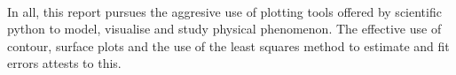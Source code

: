 \documentclass[a4paper, 11pt, margin= 1.25cm]{article}
\begin{document}
\paragraph{} In all, this report pursues the aggresive use of plotting tools offered
by scientific python to model, visualise and study physical phenomenon.
The effective use of contour, surface plots and the use of the least
squares method to estimate and fit errors attests to this.


    
    
    
    
\end{document}
